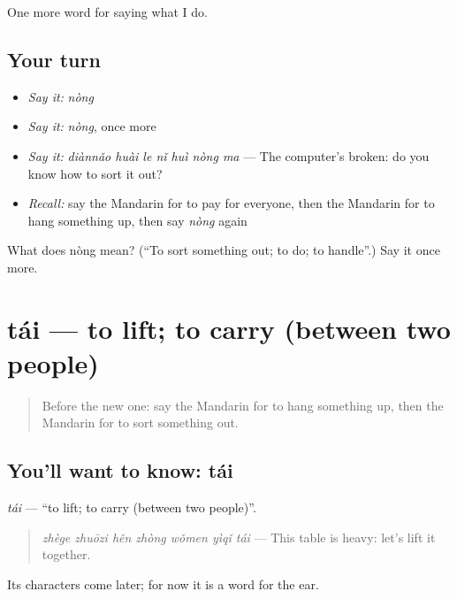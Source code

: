 \begin{grammarlens}[title={What you've built}]
One more word for saying what I do.
\end{grammarlens}

\subsection*{Your turn}
\begin{itemize}
\raggedright
  \item \emph{Say it:} \emph{nòng}
  \item \emph{Say it:} \emph{nòng}, once more
  \item \emph{Say it:} \emph{diànnǎo huài le nǐ huì nòng ma} — The computer's broken: do you know how to sort it out?
  \item \emph{Recall:} say the Mandarin for to pay for everyone, then the Mandarin for to hang something up, then say \emph{nòng} again
\end{itemize}

\begin{tcolorbox}[breakable,colback=teal!4,colframe=teal!35!black,title={Before you move on}]
What does nòng mean? (\textquotedblleft{}To sort something out; to do; to handle\textquotedblright{}.) Say it once more.
\end{tcolorbox}
\section[tái]{tái — to lift; to carry (between two people)}

\label{lesson:ZH-C174-tai}



\begin{quote}
Before the new one: say the Mandarin for to hang something up, then the Mandarin for to sort something out.
\end{quote}

\subsection*{You'll want to know: tái}
\emph{tái} — \textquotedblleft{}to lift; to carry (between two people)\textquotedblright{}.

\begin{quote}
\emph{zhège zhuōzi hěn zhòng wǒmen yìqǐ tái} — This table is heavy: let's lift it together.
\end{quote}

Its characters come later; for now it is a word for the ear.

